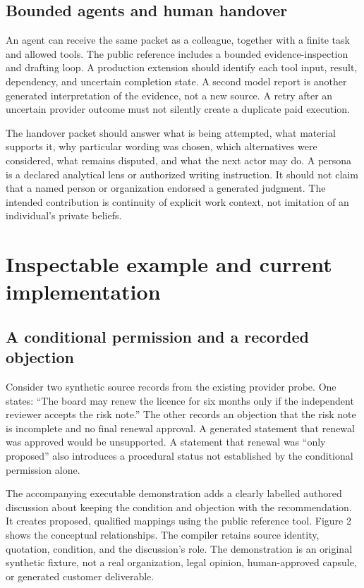 \documentclass[
  11pt,
]{article}
\let\originalsection\section
\renewcommand{\section}{\Needspace{5\baselineskip}\originalsection}
\begin{document}
\subsection{Bounded agents and human
handover}\label{bounded-agents-and-human-handover}

An agent can receive the same packet as a colleague, together with a
finite task and allowed tools. The public reference includes a bounded
evidence-inspection and drafting loop. A production extension should
identify each tool input, result, dependency, and uncertain completion
state. A second model report is another generated interpretation of the
evidence, not a new source. A retry after an uncertain provider outcome
must not silently create a duplicate paid execution.

The handover packet should answer what is being attempted, what material
supports it, why particular wording was chosen, which alternatives were
considered, what remains disputed, and what the next actor may do. A
persona is a declared analytical lens or authorized writing instruction.
It should not claim that a named person or organization endorsed a
generated judgment. The intended contribution is continuity of explicit
work context, not imitation of an individual's private beliefs.

\section{Inspectable example and current
implementation}\label{inspectable-example-and-current-implementation}

\subsection{A conditional permission and a recorded
objection}\label{a-conditional-permission-and-a-recorded-objection}

Consider two synthetic source records from the existing provider probe.
One states: ``The board may renew the licence for six months only if the
independent reviewer accepts the risk note.'' The other records an
objection that the risk note is incomplete and no final renewal
approval. A generated statement that renewal was approved would be
unsupported. A statement that renewal was ``only proposed'' also
introduces a procedural status not established by the conditional
permission alone.

The accompanying executable demonstration adds a clearly labelled
authored discussion about keeping the condition and objection with the
recommendation. It creates proposed, qualified mappings using the public
reference tool. Figure 2 shows the conceptual relationships. The
compiler retains source identity, quotation, condition, and the
discussion's role. The demonstration is an original synthetic fixture,
not a real organization, legal opinion, human-approved capsule, or
generated customer deliverable.
\end{document}
